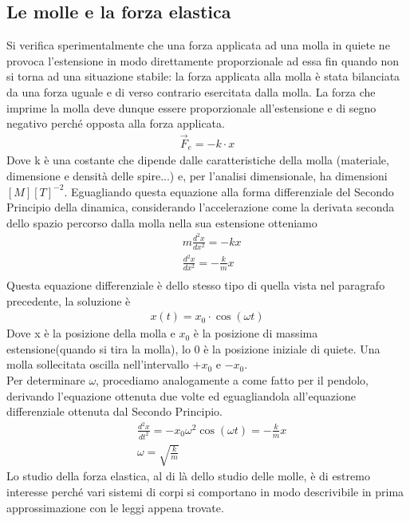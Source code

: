 \documentclass[10pt,a4paper]{article}
\begin{document}
\subsection{Le molle e la forza elastica}
Si verifica sperimentalmente che una forza applicata ad una molla in quiete ne provoca l'estensione in modo direttamente proporzionale ad essa fin quando non si torna ad una situazione stabile: la forza applicata alla molla è stata bilanciata da una forza uguale e di verso contrario esercitata dalla molla. La forza che imprime la molla deve dunque essere proporzionale all'estensione e di segno negativo perché opposta alla forza applicata. 
\begin{align*}
	\vec{F}_e = -k \cdot x
\end{align*}
Dove k è una costante che dipende dalle caratteristiche della molla (materiale, dimensione e densità delle spire...) e, per l'analisi dimensionale, ha dimensioni $[M][T]^{-2}$.
Eguagliando questa equazione alla forma differenziale del Secondo Principio della dinamica, considerando l'accelerazione come la derivata seconda dello spazio percorso dalla molla nella sua estensione otteniamo
\begin{align*}
	&m \frac{d^2x}{dx^2} = -kx\\
	&\frac{d^2x}{dx^2} = -\frac{k}{m}x\\
\end{align*}
Questa equazione differenziale è dello stesso tipo di quella vista nel paragrafo precedente, la soluzione è
\begin{align*}
	x(t) = x_0 \cdot \cos(\omega t)
\end{align*}
Dove x è la posizione della molla e $x_0$ è la posizione di massima estensione(quando si tira la molla), lo 0 è la posizione iniziale di quiete. Una molla sollecitata oscilla nell'intervallo $+x_0$ e $-x_0$.\\
Per determinare $\omega$, procediamo analogamente a come fatto per il pendolo, derivando l'equazione ottenuta due volte ed eguagliandola all'equazione differenziale ottenuta dal Secondo Principio.
\begin{align*}
	&\frac{d^2x}{dt^2}= -x_0 \omega^2 \cos(\omega t) = -\frac{k}{m}x\\
	&\omega = \sqrt{\frac{k}{m}}
\end{align*}
Lo studio della forza elastica, al di là dello studio delle molle, è di estremo interesse perché vari sistemi di corpi si comportano in modo descrivibile in prima approssimazione con le leggi appena trovate.
\end{document}

